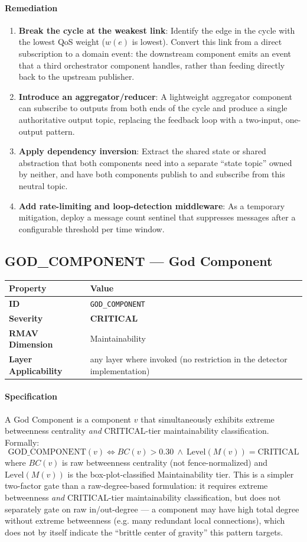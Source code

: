 \documentclass[11pt]{article}
\makeatletter
\newcommand{\CRITICAL}{\textcolor{red!70!black}{\textbf{CRITICAL}}}
\newcommand{\patternprop}[4]{%
  \begin{center}
  \begin{tabular}{@{}ll@{}}
  \toprule
  \textbf{Property} & \textbf{Value} \\
  \midrule
  \textbf{ID} & \texttt{#1} \\
  \textbf{Severity} & #2 \\
  \textbf{RMAV Dimension} & #3 \\
  \textbf{Layer Applicability} & #4 \\
  \bottomrule
  \end{tabular}
  \end{center}
}
\makeatother
\begin{document}
\paragraph{Remediation}
\begin{enumerate}[leftmargin=*]
\item \textbf{Break the cycle at the weakest link}: Identify the edge in the cycle with the lowest QoS weight ($w(e)$ is lowest). Convert this link from a direct subscription to a domain event: the downstream component emits an event that a third orchestrator component handles, rather than feeding directly back to the upstream publisher.
\item \textbf{Introduce an aggregator/reducer}: A lightweight aggregator component can subscribe to outputs from both ends of the cycle and produce a single authoritative output topic, replacing the feedback loop with a two-input, one-output pattern.
\item \textbf{Apply dependency inversion}: Extract the shared state or shared abstraction that both components need into a separate ``state topic'' owned by neither, and have both components publish to and subscribe from this neutral topic.
\item \textbf{Add rate-limiting and loop-detection middleware}: As a temporary mitigation, deploy a message count sentinel that suppresses messages after a configurable threshold per time window.
\end{enumerate}

\subsection{GOD\_COMPONENT --- God Component}
\patternprop{GOD\_COMPONENT}{\CRITICAL}{Maintainability}{any layer where invoked (no restriction in the detector implementation)}

\paragraph{Specification}
A God Component is a component $v$ that simultaneously exhibits extreme betweenness centrality \emph{and} CRITICAL-tier maintainability classification. Formally:
\[
\mathrm{GOD\_COMPONENT}(v) \Leftrightarrow BC(v) > 0.30\ \land\ \mathrm{Level}(M(v)) = \mathrm{CRITICAL}
\]
where $BC(v)$ is raw betweenness centrality (not fence-normalized) and $\mathrm{Level}(M(v))$ is the box-plot-classified Maintainability tier. This is a simpler two-factor gate than a raw-degree-based formulation: it requires extreme betweenness \emph{and} CRITICAL-tier maintainability classification, but does not separately gate on raw in/out-degree --- a component may have high total degree without extreme betweenness (e.g. many redundant local connections), which does not by itself indicate the ``brittle center of gravity'' this pattern targets.
\end{document}
